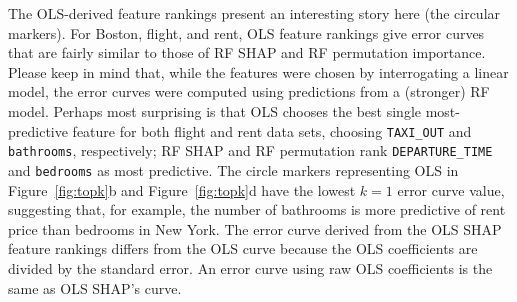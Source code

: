 \documentclass[11pt]{article}
\newcommand{\figref}[1]{Figure~\ref{#1}}
\begin{document}
The OLS-derived feature rankings present an interesting story here (the circular markers). For Boston, flight, and rent, OLS feature rankings give error curves that are fairly similar to those of RF SHAP and RF permutation importance.  Please keep in mind that, while the features were chosen by interrogating a linear model, the error curves were  computed using predictions from a (stronger) RF model.  Perhaps most surprising is that OLS chooses the best single most-predictive feature for both flight and rent data sets, choosing {\tt TAXI\_OUT} and {\tt bathrooms}, respectively; RF SHAP and RF permutation rank {\tt DEPARTURE\_TIME} and {\tt bedrooms} as most predictive. The circle markers representing OLS in \figref{fig:topk}b and \figref{fig:topk}d have the lowest $k=1$ error curve value,  suggesting that, for example, the number of bathrooms is more predictive of rent price than bedrooms in New York. The error curve derived from the OLS SHAP feature rankings differs from the OLS curve because the OLS coefficients are divided by the standard error. An error curve using raw OLS coefficients is the same as OLS SHAP's curve.
\end{document}
